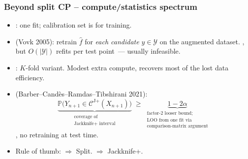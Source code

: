 \documentclass[11pt, aspectratio=169, xcolor={dvipsnames}, usepdftitle=false]{beamer}
\begin{document}
\begin{frame}
\frametitle{Beyond split CP -- compute/statistics spectrum}
\begin{itemize}
\item {}: one fit; calibration set is  for training. 
\item {} (Vovk 2005): retrain $\hat{f}$ for \emph{each candidate} $y \in \mathcal{Y}$ on the augmented dataset. , but $O(|\mathcal{Y}|)$ refits per test point~--- usually infeasible.
\item {}: $K$-fold variant. Modest extra compute, recovers most of the lost data efficiency.
\item {} (Barber--Cand\`es--Ramdas--Tibshirani 2021):
\begin{equation*}
\underbrace{\mathbb{P}\bigl(Y_{n+1} \in \mathcal{C}^{\text{J+}}(X_{n+1})\bigr)}_{\substack{\text{coverage of}\\\text{Jackknife+ interval}}}
\;\geq\;
\underbrace{1 - 2\alpha}_{\substack{\text{factor-2 looser bound;}\\\text{LOO from one fit via}\\\text{comparison-matrix argument}}}
\end{equation*}
\quad {}, no retraining at test time. 
\item Rule of thumb:  $\Rightarrow$ Split.  $\Rightarrow$ Jackknife+.
\end{itemize}
\end{frame}
\end{document}
